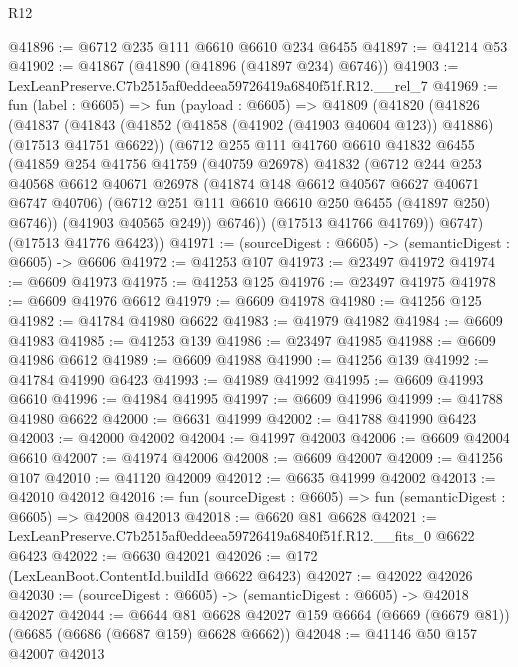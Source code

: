 \begin{lexlean}{R12}
\begin{coremodule}
@41896 := @6712 @235 @111 @6610 @6610 @234 @6455
@41897 := @41214 @53
@41902 := @41867 (@41890 (@41896 (@41897 @234) @6746))
@41903 := LexLeanPreserve.C7b2515af0eddeea59726419a6840f51f.R12.__rel_7
@41969 := fun (label : @6605) =>
  fun (payload : @6605) =>
  @41809
    (@41820
      (@41826
        (@41837
          (@41843
            (@41852 (@41858 (@41902 (@41903 @40604 @123)) @41886) (@17513 @41751 @6622))
            (@6712
              @255
              @111
              @41760
              @6610
              @41832
              @6455
              (@41859
                @254
                @41756
                @41759
                (@40759 @26978)
                @41832
                (@6712
                  @244
                  @253
                  @40568
                  @6612
                  @40671
                  @26978
                  (@41874 @148 @6612 @40567 @6627 @40671 @6747 @40706)
                  (@6712 @251 @111 @6610 @6610 @250 @6455 (@41897 @250) @6746))
                (@41903 @40565 @249))
              @6746))
          (@17513 @41766 @41769))
        @6747)
      (@17513 @41776 @6423))
@41971 := (sourceDigest : @6605) -> (semanticDigest : @6605) -> @6606
@41972 := @41253 @107
@41973 := @23497 @41972
@41974 := @6609 @41973
@41975 := @41253 @125
@41976 := @23497 @41975
@41978 := @6609 @41976 @6612
@41979 := @6609 @41978
@41980 := @41256 @125
@41982 := @41784 @41980 @6622
@41983 := @41979 @41982
@41984 := @6609 @41983
@41985 := @41253 @139
@41986 := @23497 @41985
@41988 := @6609 @41986 @6612
@41989 := @6609 @41988
@41990 := @41256 @139
@41992 := @41784 @41990 @6423
@41993 := @41989 @41992
@41995 := @6609 @41993 @6610
@41996 := @41984 @41995
@41997 := @6609 @41996
@41999 := @41788 @41980 @6622
@42000 := @6631 @41999
@42002 := @41788 @41990 @6423
@42003 := @42000 @42002
@42004 := @41997 @42003
@42006 := @6609 @42004 @6610
@42007 := @41974 @42006
@42008 := @6609 @42007
@42009 := @41256 @107
@42010 := @41120 @42009
@42012 := @6635 @41999 @42002
@42013 := @42010 @42012
@42016 := fun (sourceDigest : @6605) => fun (semanticDigest : @6605) => @42008 @42013
@42018 := @6620 @81 @6628
@42021 := LexLeanPreserve.C7b2515af0eddeea59726419a6840f51f.R12.__fits_0 @6622 @6423
@42022 := @6630 @42021
@42026 := @172 (LexLeanBoot.ContentId.buildId @6622 @6423)
@42027 := @42022 @42026
@42030 := (sourceDigest : @6605) -> (semanticDigest : @6605) -> @42018 @42027
@42044 := @6644
    @81
    @6628
    @42027
    @159
    @6664
    (@6669 (@6679 @81))
    (@6685 (@6686 (@6687 @159) @6628 @6662))
@42048 := @41146 @50 @157 @42007 @42013

\end{coremodule}
\end{lexlean}
